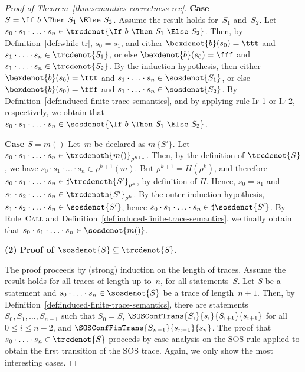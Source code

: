 \documentclass[a4paper,numberwithinsect]{lipics-v2021}
\begin{document}
\begin{proof}[Proof of Theorem~\ref{thm:semantics-correctness-rec}]
\noindent\textbf{Case $S = \If\ b\ \Then\ S_1\ \Else\ S_2$.}
%
Assume the result holds for~$S_1$ and~$S_2$.
%
Let 
$s_0 \cdot s_1 \cdot \ldots \cdot s_n \in 
 \trcdenot{\If\ b\ \Then\ S_1\ \Else\ S_2}$.
Then, by Definition~\ref{def:while-tr}, 
$s_0 = s_1$, and either $\bexdenot{b} (s_0) = \ttt$ and 
$s_1 \cdot \ldots \cdot s_n \in \trcdenot{S_1}$,
or else $\bexdenot{b} (s_0) = \fff$ and 
$s_1 \cdot \ldots \cdot s_n \in \trcdenot{S_2}$.
By the induction hypothesis, then 
either $\bexdenot{b} (s_0) = \ttt$ and 
$s_1 \cdot \ldots \cdot s_n \in \sosdenot{S_1}$,
or else $\bexdenot{b} (s_0) = \fff$ and 
$s_1 \cdot \ldots \cdot s_n \in \sosdenot{S_2}$.
%
By Definition~\ref{def:induced-finite-trace-semantics},
and by applying rule \textsc{If-1} or \textsc{If-2},
respectively, we obtain that
$s_0 \cdot s_1 \cdot \ldots \cdot s_n \in 
 \sosdenot{\If\ b\ \Then\ S_1\ \Else\ S_2}$.

\noindent\textbf{Case $S = m ()$} Let~$m$ be declared as $m\, \{S'\}$.
%
Let 
$s_0 \cdot s_1 \cdot \ldots \cdot s_n \in \trcdenoth{m ()}_{\rho^{k+1}}$.
%
Then, by the definition of $\trcdenot{S}$, we have
$s_0 \cdot s_1 \cdot \ldots \cdot s_n \in \rho^{k+1} (m)$.  But
$\rho^{k+1} = H (\rho^k)$, and therefore
$s_0 \cdot s_1 \cdot \ldots \cdot s_n \in \sharp
\trcdenoth{S'}_{\rho^k}$, by definition of $H$.
%
Hence, $s_0 = s_1$ and
$s_1 \cdot s_2 \cdot \ldots \cdot s_n \in \trcdenoth{S'}_{\rho^k}$.
By the outer induction hypothesis,
$s_1 \cdot s_2 \cdot \ldots \cdot s_n \in \sosdenot{S'}$, hence
$s_0 \cdot s_1 \cdot \ldots \cdot s_n \in \sharp \sosdenot{S'}$. By
Rule~\textsc{Call} and
Definition~\ref{def:induced-finite-trace-semantics}, we finally obtain
that $s_0 \cdot s_1 \cdot \ldots \cdot s_n \in \sosdenot{m ()}$.

\noindent\textbf{(2) Proof of $\sosdenot{S} \subseteq \trcdenot{S}$.}

The proof proceeds by (strong) induction on the length of traces.
%
Assume the result holds for all traces of length up to~$n$, for all
statements~$S$. Let $S$ be a statement and
$s_0 \cdot \ldots \cdot s_n \in \sosdenot{S}$ be a trace of
length~$n+1$. Then, by
Definition~\ref{def:induced-finite-trace-semantics}, there are
statements $S_0, S_1, \ldots, S_{n-1}$ such that $S_0 = S$,
$\SOSConfTrans{S_i}{s_i}{S_{i+1}}{s_{i+1}}$ for all
$0 \leq i \leq n-2$, and $\SOSConfFinTrans{S_{n-1}}{s_{n-1}}{s_n}$.
The proof that $s_0 \cdot \ldots \cdot s_n \in \trcdenot{S}$ proceeds
by case analysis on the SOS rule applied to obtain the first
transition of the SOS trace.
%
Again, we only show the most interesting cases.


\end{proof}
\end{document}
